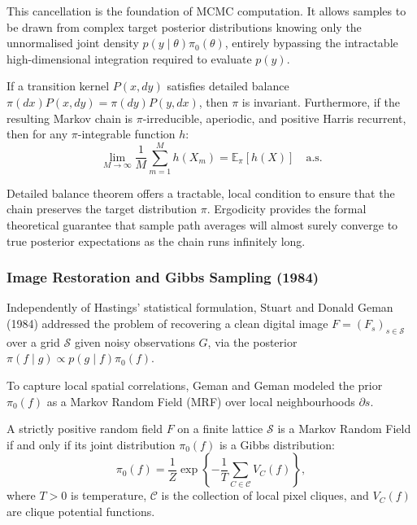 \noindent This cancellation is the foundation of MCMC computation. It allows samples to be drawn from complex target posterior distributions knowing only the unnormalised joint density $p(y \mid \theta)\pi_0(\theta)$, entirely bypassing the intractable high-dimensional integration required to evaluate $p(y)$.

\begin{theorem}
\label{thm:mcmc-ergodic}
If a transition kernel $P(x, dy)$ satisfies detailed balance $\pi(dx) P(x, dy) = \pi(dy) P(y, dx)$, then $\pi$ is invariant. Furthermore, if the resulting Markov chain is $\pi$-irreducible, aperiodic, and positive Harris recurrent, then for any $\pi$-integrable function $h$:
\begin{equation}
    \lim_{M \to \infty} \frac{1}{M} \sum_{m=1}^{M} h(X_m) = \mathbb{E}_\pi[h(X)] \quad \text{a.s.}
\end{equation}
\end{theorem}

\noindent Detailed balance theorem offers a tractable, local condition to ensure that the chain preserves the target distribution $\pi$. Ergodicity provides the formal theoretical guarantee that sample path averages will almost surely converge to true posterior expectations as the chain runs infinitely long.

\subsubsection{Image Restoration and Gibbs Sampling (1984)}
\label{subsec:gibbs-sampling}

Independently of Hastings' statistical formulation, Stuart and Donald Geman (1984) \cite{geman1984} addressed the problem of recovering a clean digital image $F = (F_s)_{s \in \mathcal{S}}$ over a grid $\mathcal{S}$ given noisy observations $G$, via the posterior $\pi(f \mid g) \propto p(g \mid f) \pi_0(f)$.

To capture local spatial correlations, Geman and Geman modeled the prior $\pi_0(f)$ as a Markov Random Field (MRF) over local neighbourhoods $\partial s$.

\begin{theorem}
\label{thm:hammersley-clifford}
A strictly positive random field $F$ on a finite lattice $\mathcal{S}$ is a Markov Random Field if and only if its joint distribution $\pi_0(f)$ is a Gibbs distribution:
\begin{equation}
    \pi_0(f) = \frac{1}{Z} \exp\left\{ -\frac{1}{T} \sum_{C \in \mathcal{C}} V_C(f) \right\},
\end{equation}
where $T > 0$ is temperature, $\mathcal{C}$ is the collection of local pixel cliques, and $V_C(f)$ are clique potential functions.
\end{theorem}

